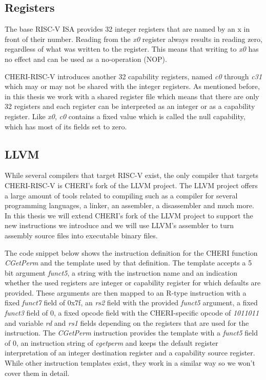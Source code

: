 
\subsection{Registers}
The base RISC-V ISA provides 32 integer registers that are named by an x in front of their number.
Reading from the \textit{x0} register always results in reading zero, regardless of what was written to the register.
This means that writing to \textit{x0} has no effect and can be used as a no-operation (NOP).

CHERI-RISC-V introduces another 32 capability registers, named \textit{c0} through \textit{c31} which may or may not be shared with the integer registers.
As mentioned before, in this thesis we work with a shared register file which means that there are only 32 registers and each register can be interpreted as an integer or as a capability register.
Like \textit{x0}, \textit{c0} contains a fixed value which is called the null capability, which has most of its fields set to zero.


\subsection{LLVM}
\label{sec:llvm_background}
While several compilers that target RISC-V exist, the only compiler that targets CHERI-RISC-V is CHERI's fork of the LLVM project.
The LLVM project offers a large amount of tools related to compiling such as a compiler for several programming languages, a linker, an assembler, a disassembler and much more.
In this thesis we will extend CHERI's fork of the LLVM project to support the new instructions we introduce and we will use LLVM's assembler to turn assembly source files into executable binary files.

The code snippet below shows the instruction definition for the CHERI function \textit{CGetPerm} and the template used by that definition.
The template accepts a 5 bit argument \textit{funct5}, a string with the instruction name and an indication whether the used registers are integer or capability register for which defaults are provided.
These arguments are then mapped to an R-type instruction with a fixed \textit{funct7} field of 0x7f, an \textit{rs2} field with the provided \textit{funct5} argument, a fixed \textit{funct3} field of 0, a fixed opcode field with the CHERI-specific opcode of \textit{1011011} and variable \textit{rd} and \textit{rs1} fields depending on the registers that are used for the instruction.
The \textit{CGetPerm} instruction provides the template with a \textit{funct5} field of 0, an instruction string of \textit{cgetperm} and keeps the default register interpretation of an integer destination register and a capability source register.
While other instruction templates exist, they work in a similar way so we won't cover them in detail.

